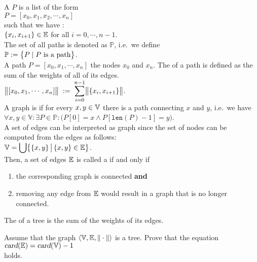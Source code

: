\noindent
A  $P$ is a list of the form 
\\[0.2cm]
\hspace*{1.3cm} 
$P = [ x_0, x_1, x_2, \cdots, x_n ]$ 
\\[0.2cm]
such that we have : \\[0.2cm]
\hspace*{1.3cm}
$\{x_i,x_{i+1}\} \in {\mathbb E}$  \quad for all $i = 0, \cdots, n-1$.
\\[0.2cm]
The set of all paths is denoted as $\mathbb{P}$, i.e.~we define
\\[0.2cm]
\hspace*{1.3cm}
$\displaystyle \mathbb{P}  := \bigl\{ P \mid \mbox{$P$ is a path} \bigr\}$.
\\[0.2cm]
A path $P = [ x_0, x_1, \cdots, x_n]$  the nodes $x_0$ and $x_n$.  The  of a path is defined as
the sum of the weights of all of its edges.  
\\[0.2cm]
\hspace*{1.3cm}
 $\displaystyle\bigl\|[x_0,x_1, \cdots, x_n]\bigr\| \;:=\; \sum\limits_{i=0}^{n-1} \bigl\|\{x_i,x_{i+1}\}\bigr\|$. 
\\[0.2cm]
A graph is  if for every $x,y \in {\mathbb V}$ there is a path connecting $x$ and $y$, i.e.~we have
\\[0.2cm]
\hspace*{1.3cm}
$\forall x, y \in \mathbb{V}: \exists P \in \mathbb{P}: \bigl(P[0] = x \wedge P[\texttt{len}(P)-1] = y\bigr)$.
\\[0.2cm]
A set of edges can be interpreted as graph since the set of nodes can be computed from the edges as
follows: 
\\[0.2cm]
\hspace*{1.3cm}
$\displaystyle{\mathbb V} = \bigcup \bigl\{\{x,y\} \,\big|\, \{x,y\} \in {\mathbb E} \bigr\}$.
\\[0.2cm]
Then, a set of edges ${\mathbb E}$ is called a  if and only if
\begin{enumerate}
\item the corresponding graph is connected \quad \textbf{and}
\item removing any edge from ${\mathbb E}$ would result in a graph that is no longer connected.
\end{enumerate}
The  of a tree is the sum of the weights of its edges.

\exercise
Assume that the graph $\langle {\mathbb V}, {\mathbb E}, \|\cdot\|\rangle$ is a tree.  Prove that the equation
\\[0.2cm]
\hspace*{1.3cm}
$\textsl{card}({\mathbb E}) = \textsl{card}({\mathbb V}) - 1$
\\[0.2cm]
holds.  
\vspace*{0.2cm}

